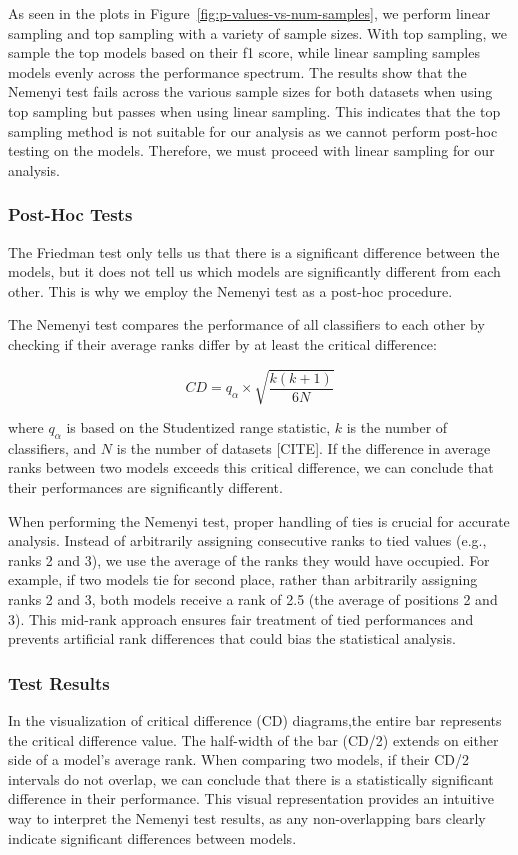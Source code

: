 As seen in the plots in Figure~\ref{fig:p-values-vs-num-samples}, we perform linear sampling and top sampling with a variety
of sample sizes. With top sampling, we sample the top models based on their f1 score, while linear sampling samples models
evenly across the performance spectrum. The results show that the Nemenyi test fails across the various sample sizes for both datasets
when using top sampling but passes when using linear sampling. This indicates that the top sampling method is not suitable for our analysis
as we cannot perform post-hoc testing on the models. Therefore, we must proceed with linear sampling for our analysis.

\subsubsection{Post-Hoc Tests}
The Friedman test only tells us that there is a significant difference between the models,
but it does not tell us which models are significantly different from each other.
This is why we employ the Nemenyi test as a post-hoc procedure.

The Nemenyi test compares the performance of all classifiers to each
other by checking if their average ranks differ by at least the critical difference:

\begin{equation}
    CD = q_{\alpha} \times \sqrt{\frac{k(k+1)}{6N}}
\end{equation}

where $q_{\alpha}$ is based on the Studentized range statistic, $k$ is the number of classifiers, and $N$ is the number of datasets [CITE].
If the difference in average ranks between two models exceeds this critical difference, we can conclude that their performances are significantly different.

When performing the Nemenyi test, proper handling of ties is crucial for accurate analysis.
Instead of arbitrarily assigning consecutive ranks to tied values (e.g., ranks 2 and 3), we use the
average of the ranks they would have occupied. For example, if two models tie for second place,
rather than arbitrarily assigning ranks 2 and 3, both models receive a rank of 2.5 (the average of positions 2 and 3).
This mid-rank approach ensures fair treatment of tied performances and prevents artificial rank differences that could bias the statistical analysis.

\subsubsection{Test Results}
In the visualization of critical difference (CD) diagrams,the entire bar represents the critical difference value.
The half-width of the bar (CD/2) extends on either side of a model's average rank. When comparing two models,
if their CD/2 intervals do not overlap, we can conclude that there is a statistically significant difference in their performance.
This visual representation provides an intuitive way to interpret the Nemenyi test results, as any
non-overlapping bars clearly indicate significant differences between models.

